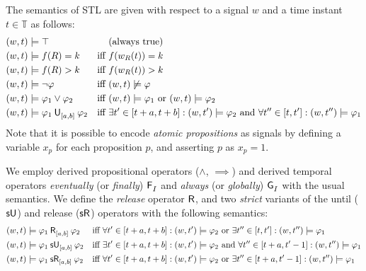 \documentclass[acmsmall,screen]{acmart}
\begin{document}
The semantics of STL are given with respect to a signal $w$ and a time instant $t \in \mathbb{T}$ as follows:
\begin{align*}
&(w,t) \models \top && \text{(always true)} \\
&(w,t) \models f(R) = k     & \text{iff } & f(w_R(t)) = k \\
&(w,t) \models f(R) > k     & \text{iff } & f(w_R(t)) > k \\
&(w,t) \models \neg \varphi & \text{iff } & (w,t) \not\models  \varphi \\
&(w,t) \models \varphi_1 \lor \varphi_2 & \text{iff } & (w,t) \models \varphi_1 \text{ or } (w,t) \models \varphi_2 \\
&(w,t) \models \until{[a,b]}{\varphi_1}{\varphi_2}  & \text{iff } & \exists t' \in [t+a, t+b] : (w, t') \models \varphi_2 %
\text{ and } \forall t'' \in [t, t'] : (w,t'') \models \varphi_1
\end{align*}
Note that it is possible to encode \emph{atomic propositions} as signals by defining a variable $x_p$
for each proposition $p$, and asserting $p$ as $x_p = 1$.

We employ derived propositional operators ($\land$, $\implies$)
and derived temporal operators \emph{eventually} (or \emph{finally}) $\mathop{\mathsf{\mathsf{F}}^{{}}_{I}}$
and \emph{always} (or \emph{globally}) $\mathop{\mathsf{\mathsf{G}}^{{}}_{I}}$ with the usual semantics.
We define the \emph{release} operator $\mathsf{R}$,
and two \emph{strict} variants of the until ($\mathsf{sU}$) and release ($\mathsf{sR}$) operators with the following semantics:
\begin{align*}
&(w,t) \models \release{[a,b]}{\varphi_1}{\varphi_2} & \text{iff } & \forall t' \in [t+a, t+b] : (w, t') \models \varphi_2 %
\text{ or } \exists t'' \in [t, t'] : (w,t'') \models \varphi_1 \\
&(w,t) \models \suntil{[a,b]}{\varphi_1}{\varphi_2} & \text{iff } & \exists t' \in [t+a, t+b] : (w, t') \models \varphi_2 %
\text{ and } \forall t'' \in [t+a, t'-1] : (w,t'') \models \varphi_1 \\
&(w,t) \models \srelease{[a,b]}{\varphi_1}{\varphi_2} & \text{iff } & \forall t' \in [t+a, t+b] : (w, t') \models \varphi_2 %
\text{ or } \exists t'' \in [t+a, t'-1] : (w,t'') \models \varphi_1
\end{align*}
\end{document}
